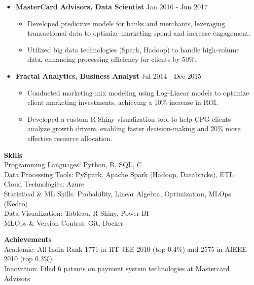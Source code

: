 \documentclass[a4paper,10pt]{article}
\begin{document}
\begin{itemize}[leftmargin=0.15in]
    \item \textbf{MasterCard Advisors, Data Scientist} \hfill Jan 2016 - Jun 2017
    \begin{itemize}
        \item Developed predictive models for banks and merchants, leveraging transactional data to optimize marketing spend and increase engagement.
        \item Utilized big data technologies (Spark, Hadoop) to handle high-volume data, enhancing processing efficiency for clients by 50\%.
    \end{itemize}

    \item \textbf{Fractal Analytics, Business Analyst} \hfill Jul 2014 - Dec 2015
    \begin{itemize}
        \item Conducted marketing mix modeling using Log-Linear models to optimize client marketing investments, achieving a 10\% increase in ROI.
        \item Developed a custom R Shiny visualization tool to help CPG clients analyze growth drivers, enabling faster decision-making and 20\% more effective resource allocation.
    \end{itemize}
\end{itemize}

\vspace{3mm}

\textbf{Skills} \\
Programming Languages: Python, R, SQL, C \\
Data Processing Tools: PySpark, Apache Spark (Hadoop, Databricks), ETL \\
Cloud Technologies: Azure \\
Statistical \& ML Skills: Probability, Linear Algebra, Optimization, MLOps (Kedro) \\
Data Visualization: Tableau, R Shiny, Power BI \\
MLOps \& Version Control: Git, Docker

\vspace{3mm}

\textbf{Achievements} \\
Academic: All India Rank 1771 in IIT JEE 2010 (top 0.4\%) and 2575 in AIEEE 2010 (top 0.3\%) \\
Innovation: Filed 6 patents on payment system technologies at Mastercard Advisors
\end{document}
